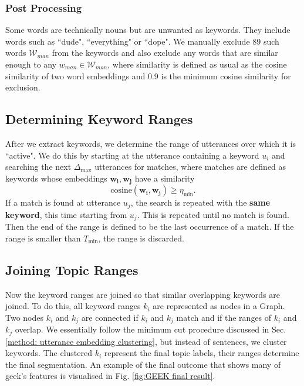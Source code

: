         \subsubsection{Post Processing}
            Some words are technically nouns but are unwanted as keywords. They include words such as ``dude", ``everything" or ``dope". We manually exclude 89 such words $\mathcal{W}_{man}$ from the keywords and also exclude any words that are similar enough to any $w_{man} \in \mathcal{W}_{man}$, where similarity is defined as usual as the cosine similarity of two word \glspl{embedding} and $0.9$ is the minimum cosine similarity for exclusion.

    \subsection{Determining Keyword Ranges}
        After we extract keywords, we determine the range of \glspl{utterance} over which it is ``active". We do this by starting at the \gls{utterance} containing a keyword $u_i$ and searching the next $\Delta_{\text{max}}$ \glspl{utterance} for matches, where matches are defined as keywords whose \glspl{embedding} $\mathbf{w_i}, \mathbf{w_j}$ have a similarity
        \begin{equation}
            \text{cosine}(\mathbf{w_i}, \mathbf{w_j}) \geq \eta_{\text{min}}.
        \end{equation}
        If a match is found at \gls{utterance} $u_j$, the search is repeated with the \textbf{same keyword}, this time starting from $u_j$. This is repeated until no match is found. Then the end of the range is defined to be the last occurrence of a match. If the range is smaller than $T_{\text{min}}$, the range is discarded.

    \subsection{Joining Topic Ranges}
        Now the keyword ranges are joined so that similar overlapping keywords are joined. To do this, all keyword ranges $k_i$ are represented as nodes in a Graph. Two nodes $k_i$ and $k_j$ are connected if $k_i$ and $k_j$ match and if the ranges of $k_i$ and $k_j$ overlap. We essentially follow the minimum cut procedure discussed in Sec. \ref{method: utterance embedding clustering}, but instead of sentences, we cluster keywords. The clustered $k_i$ represent the final topic labels, their ranges determine the final segmentation. An example of the final outcome that shows many of \gls{geek}'s features is visualised in Fig. \ref{fig:GEEK final result}.

